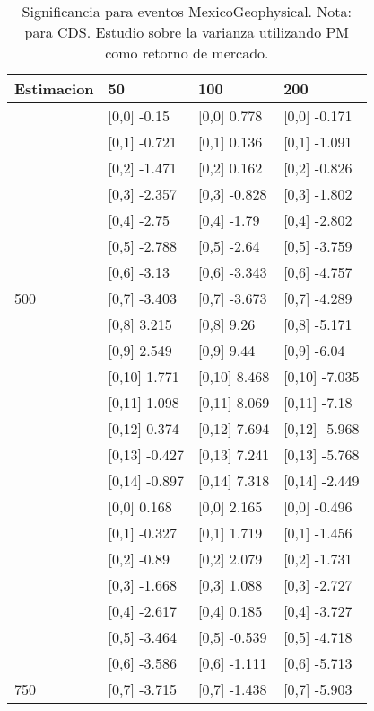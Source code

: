 \begin{table}

\caption{Significancia para eventos MexicoGeophysical. Nota: para CDS. Estudio sobre la varianza utilizando PM como retorno de mercado.}
\centering
\begin{tabular}[t]{llll}
\toprule
Estimacion & 50 & 100 & 200\\
\midrule
 & {}[0,0] -0.15 & {}[0,0] 0.778 & {}[0,0] -0.171\\
 & {}[0,1] -0.721 & {}[0,1] 0.136 & {}[0,1] -1.091\\
 & {}[0,2] -1.471 & {}[0,2] 0.162 & {}[0,2] -0.826\\
 & {}[0,3] -2.357 & {}[0,3] -0.828 & {}[0,3] -1.802\\
 & {}[0,4] -2.75 & {}[0,4] -1.79 & {}[0,4] -2.802\\
\addlinespace
 & {}[0,5] -2.788 & {}[0,5] -2.64 & {}[0,5] -3.759\\
 & {}[0,6] -3.13 & {}[0,6] -3.343 & {}[0,6] -4.757\\
500 & {}[0,7] -3.403 & {}[0,7] -3.673 & {}[0,7] -4.289\\
 & {}[0,8] 3.215 & {}[0,8] 9.26 & {}[0,8] -5.171\\
 & {}[0,9] 2.549 & {}[0,9] 9.44 & {}[0,9] -6.04\\
\addlinespace
 & {}[0,10] 1.771 & {}[0,10] 8.468 & {}[0,10] -7.035\\
 & {}[0,11] 1.098 & {}[0,11] 8.069 & {}[0,11] -7.18\\
 & {}[0,12] 0.374 & {}[0,12] 7.694 & {}[0,12] -5.968\\
 & {}[0,13] -0.427 & {}[0,13] 7.241 & {}[0,13] -5.768\\
 & {}[0,14] -0.897 & {}[0,14] 7.318 & {}[0,14] -2.449\\
\addlinespace
 & {}[0,0] 0.168 & {}[0,0] 2.165 & {}[0,0] -0.496\\
 & {}[0,1] -0.327 & {}[0,1] 1.719 & {}[0,1] -1.456\\
 & {}[0,2] -0.89 & {}[0,2] 2.079 & {}[0,2] -1.731\\
 & {}[0,3] -1.668 & {}[0,3] 1.088 & {}[0,3] -2.727\\
 & {}[0,4] -2.617 & {}[0,4] 0.185 & {}[0,4] -3.727\\
\addlinespace
 & {}[0,5] -3.464 & {}[0,5] -0.539 & {}[0,5] -4.718\\
 & {}[0,6] -3.586 & {}[0,6] -1.111 & {}[0,6] -5.713\\
750 & {}[0,7] -3.715 & {}[0,7] -1.438 & {}[0,7] -5.903\\

\end{tabular}
\end{table}

